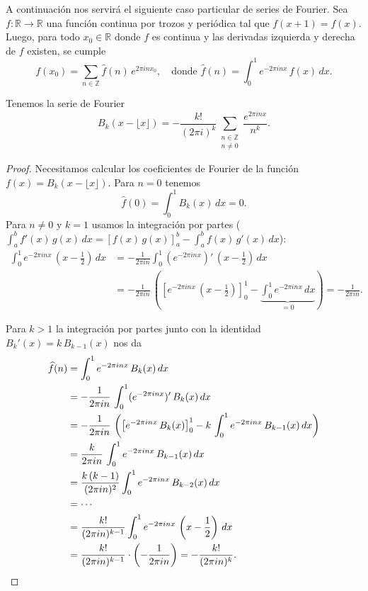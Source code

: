 A continuación nos servirá el siguiente caso particular de series de Fourier.
Sea $f\colon \mathbb{R} \to \mathbb{R}$ una función continua por trozos y
periódica tal que $f (x+1) = f (x)$. Luego, para todo $x_0\in \mathbb{R}$ donde
$f$ es continua y las derivadas izquierda y derecha de $f$ existen, se cumple
\[ f (x_0) = \sum_{n\in\mathbb{Z}} \widehat{f} (n) \, e^{2\pi i n x_0},
   \quad\text{donde }
   \widehat{f} (n) = \int_0^1 e^{-2\pi i n x} \, f(x) \, dx. \]

\begin{proposicion}
  Tenemos la serie de Fourier
  \begin{equation}
    \label{eq:serie-de-Fourier-polinomios-de-Bernoulli}
    B_k (x - \lfloor x\rfloor) = -\frac{k!}{(2\pi i)^k}\sum_{\substack{n\in \mathbb{Z} \\ n \ne 0}} \frac{e^{2\pi i n x}}{n^k}.
  \end{equation}

  \begin{proof}
    Necesitamos calcular los coeficientes de Fourier de la función
    $f (x) = B_k (x - \lfloor x\rfloor)$. Para $n = 0$ tenemos
    $$\widehat{f} (0) = \int_0^1 B_k (x)\,dx = 0.$$
    Para $n \ne 0$ y $k = 1$ usamos la integración por partes
    ($\int_a^b f'(x)\,g(x)\,dx = \left[f(x)\,g(x)\right]_a^b - \int_a^b f(x) \, g'(x)\,dx$):
    \begin{align*}
      \int_0^1 e^{-2\pi i n x}\,\left(x - \frac{1}{2}\right)\,dx & = -\frac{1}{2\pi i n} \int_0^1 \left(e^{-2\pi i n x}\right)' \, \left(x - \frac{1}{2}\right)\,dx \\
      & = -\frac{1}{2\pi i n} \, \left( \left[e^{-2\pi i n x}\,\left(x - \frac{1}{2}\right)\right]^1_0 - \underbrace{\int_0^1 e^{-2\pi i n x}\,dx}_{=0} \right) = -\frac{1}{2\pi i n}.
    \end{align*}

    Para $k > 1$ la integración por partes junto con la identidad
    $B_k' (x) = k\,B_{k-1} (x)$ nos da
    \begin{align*}
      \widehat{f} (n) & = \int_0^1 e^{-2\pi i n x} \, B_k (x)\,dx \\
      & = -\frac{1}{2\pi i n}\,\int_0^1 (e^{-2\pi i n x})' \, B_k (x)\,dx \\
      & = -\frac{1}{2\pi i n}\,\left(\left[e^{-2\pi i n x}\,B_k (x)\right]_0^1 - k\,\int_0^1 e^{-2\pi i n x} \, B_{k-1} (x)\,dx\right) \\
      & = \frac{k}{2\pi i n} \, \int_0^1 e^{-2\pi i n x}\,B_{k-1} (x)\,dx \\
      & = \frac{k\,(k-1)}{(2\pi i n)^2} \int_0^1 e^{-2\pi i n x}\,B_{k-2} (x)\,dx \\
      & = \cdots \\
      & = \frac{k!}{(2\pi i n)^{k-1}} \int_0^1 e^{-2\pi i n x}\,\left(x - \frac{1}{2}\right)\,dx \\
      & = \frac{k!}{(2\pi i n)^{k-1}} \cdot \left(-\frac{1}{2\pi i n}\right) = -\frac{k!}{(2\pi i n)^k}. \qedhere
    \end{align*}
  \end{proof}
\end{proposicion}

